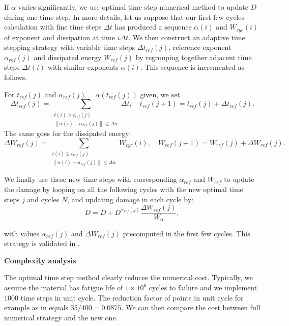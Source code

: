 If $\alpha$ varies significantly, we use optimal time step numerical method to update $D$ during one time step. In more details, let us suppose that our first few cycles calculation with fine time steps $\Delta t$ has produced a sequence $\alpha(i)$ and $W_{cyc}(i)$ of exponent and dissipation at time $i\Delta t$. We then construct an adaptive time stepping strategy with variable time steps $\Delta t_{ref}(j)$, reference exponent $\alpha_{ref}(j)$ and dissipated energy $W_{ref}(j)$ by regrouping together adjacent time steps $\Delta t(i)$ with similar exponents $\alpha(i)$. This sequence is incremented as follows.


For $t_{ref}(j)$ and $\alpha_{ref}(j)=\alpha(t_{ref}(j))$ given, we set
$$\Delta t_{ref}(j)=\sum_{\substack{t(i)\geqslant t_{ref}(j)\\\left\| \alpha(i)-\alpha_{ref}(j)\right\|\leqslant \Delta\alpha }}\Delta t, \quad t_{ref}(j+1)=t_{ref}(j)+\Delta t_{ref}(j).$$
The same goes for the dissipated energy:
$$\Delta W_{ref}(j)=\sum_{\substack{t(i)\geqslant t_{ref}(j)\\\left\| \alpha(i)-\alpha_{ref}(j)\right\|\leqslant \Delta\alpha} }W_{cyc}(i) , \quad W_{ref}(j+1)=W_{ref}(j)+\Delta W_{ref}(j).$$

We finally use these new time steps with corresponding $\alpha_{ref}$ and $W_{ref}$ to update the damage by looping on all the following cycles with the new optimal time steps $j$ and cycles $N$, and updating damage in each cycle by:
\begin{equation}
D=D+D^{\alpha_{ref}(j)}\dfrac{\Delta W_{ref}(j)}{W_0},
\label{eq.optimal}
\end{equation}

with values $\alpha_{ref}(j)$ and $\Delta W_{ref}(j)$ precomputed in the first few cycles. This strategy is validated in .

\vspace{6pt}
\textbf{Complexity analysis}
\vspace{6pt}

The optimal time step method clearly reduces the numerical cost. Typically, we assume the material has fatigue life of $1\times10^{6}$ cycles to failure and we implement $1000$ time steps in unit cycle. The reduction factor of points in unit cycle for example as in  equals $35/400=0.0875$. We can then compare the cost between full numerical strategy and the new one.

